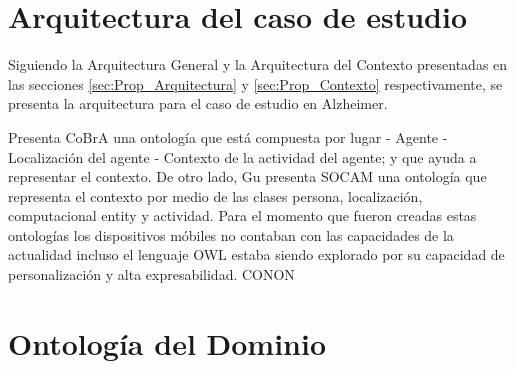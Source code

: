 \section{Arquitectura del caso de estudio}
\label{sec:CS_Comparacion}

Siguiendo la Arquitectura General y la Arquitectura del Contexto presentadas en las secciones \ref{sec:Prop_Arquitectura} y \ref{sec:Prop_Contexto}  respectivamente, se presenta la arquitectura para el caso de estudio en Alzheimer.

\cite{Chen2003} Presenta CoBrA una ontología que está compuesta por lugar - Agente - Localización del agente - Contexto de la actividad del agente; y que ayuda a representar el contexto. De otro lado, Gu \cite{Gu2004} presenta SOCAM una ontología que representa el contexto por medio de las clases persona, localización, computacional entity y actividad. Para el momento que fueron creadas estas ontologías los dispositivos móbiles no contaban con las capacidades de la actualidad incluso el lenguaje OWL estaba siendo explorado por su capacidad de personalización y alta expresabilidad.
CONON


\section{Ontología del Dominio}
\label{sec:CS_Ont_Dominio}